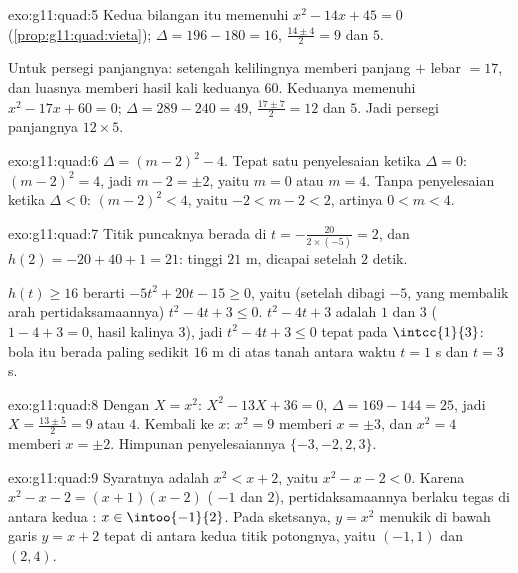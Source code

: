 \begin{solution}{exo:g11:quad:5}
Kedua bilangan itu memenuhi $x^2 - 14x + 45 = 0$ (\cref{prop:g11:quad:vieta});
$\Delta = 196 - 180 = 16$,  $\frac{14 \pm 4}{2} = 9$ dan $5$.

Untuk persegi panjangnya: setengah kelilingnya memberi panjang $+$ lebar
$= 17$, dan luasnya memberi hasil kali keduanya $60$. Keduanya memenuhi
$x^2 - 17x + 60 = 0$; $\Delta = 289 - 240 = 49$, 
$\frac{17 \pm 7}{2} = 12$ dan $5$. Jadi persegi panjangnya $12 \times 5$.
\end{solution}

\begin{solution}{exo:g11:quad:6}
$\Delta = (m-2)^2 - 4$. Tepat satu penyelesaian ketika $\Delta = 0$:
$(m-2)^2 = 4$, jadi $m - 2 = \pm 2$, yaitu $m = 0$ atau $m = 4$. Tanpa
penyelesaian ketika $\Delta < 0$: $(m-2)^2 < 4$, yaitu $-2 < m - 2 < 2$,
artinya $0 < m < 4$.
\end{solution}

\begin{solution}{exo:g11:quad:7}
Titik puncaknya berada di $t = -\frac{20}{2 \times (-5)} = 2$, dan
$h(2) = -20 + 40 + 1 = 21$: tinggi  $21$ m, dicapai setelah $2$
detik.

$h(t) \geq 16$ berarti $-5t^2 + 20t - 15 \geq 0$, yaitu (setelah dibagi $-5$,
yang membalik arah pertidaksamaannya) $t^2 - 4t + 3 \leq 0$. 
$t^2-4t+3$ adalah $1$ dan $3$ ($1 - 4 + 3 = 0$, hasil kalinya $3$), jadi
$t^2 - 4t + 3 \leq 0$ tepat pada $\intcc{1}{3}$: bola itu berada paling
sedikit $16$ m di atas tanah antara waktu $t = 1$ s dan $t = 3$ s.
\end{solution}

\begin{solution}{exo:g11:quad:8}
Dengan $X = x^2$: $X^2 - 13X + 36 = 0$, $\Delta = 169 - 144 = 25$, jadi
$X = \frac{13 \pm 5}{2} = 9$ atau $4$. Kembali ke $x$: $x^2 = 9$ memberi
$x = \pm 3$, dan $x^2 = 4$ memberi $x = \pm 2$. Himpunan penyelesaiannya
$\{-3, -2, 2, 3\}$.
\end{solution}

\begin{solution}{exo:g11:quad:9}
Syaratnya adalah $x^2 < x + 2$, yaitu $x^2 - x - 2 < 0$. Karena
$x^2 - x - 2 = (x+1)(x-2)$ ( $-1$ dan $2$), pertidaksamaannya berlaku
tegas di antara kedua : $x \in \intoo{-1}{2}$. Pada sketsanya,
 $y = x^2$ menukik di bawah garis $y = x+2$ tepat di antara kedua
titik potongnya, yaitu $(-1, 1)$ dan $(2, 4)$.
\end{solution}

